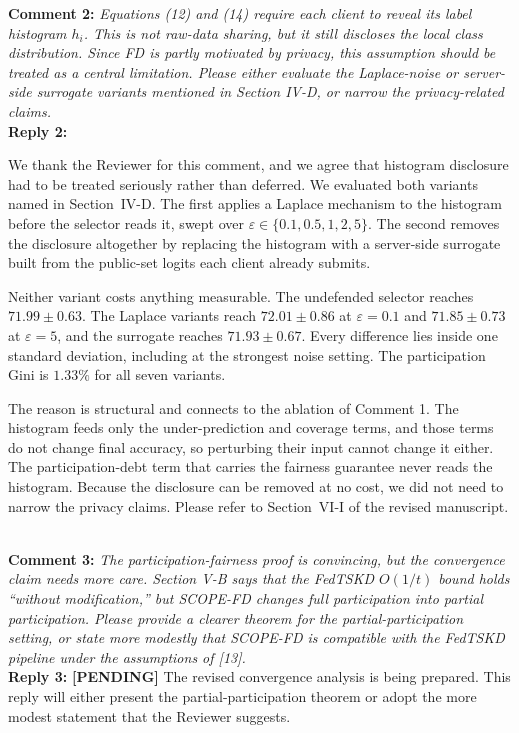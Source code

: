\documentclass[10pt]{article}
\newcommand{\PENDING}[1]{{\color{red}\textbf{[PENDING] }#1}}
\begin{document}
\noindent
\textbf{Comment 2:} \textit{Equations (12) and (14) require each client to reveal its label histogram $h_i$. This is not raw-data sharing, but it still discloses the local class distribution. Since FD is partly motivated by privacy, this assumption should be treated as a central limitation. Please either evaluate the Laplace-noise or server-side surrogate variants mentioned in Section IV-D, or narrow the privacy-related claims.} \\
\noindent
\textbf{Reply 2:} {We thank the Reviewer for this comment, and we agree that histogram disclosure had to be treated seriously rather than deferred. We evaluated both variants named in Section~IV-D. The first applies a Laplace mechanism to the histogram before the selector reads it, swept over $\varepsilon \in \{0.1, 0.5, 1, 2, 5\}$. The second removes the disclosure altogether by replacing the histogram with a server-side surrogate built from the public-set logits each client already submits.

Neither variant costs anything measurable. The undefended selector reaches $71.99 \pm 0.63$. The Laplace variants reach $72.01 \pm 0.86$ at $\varepsilon = 0.1$ and $71.85 \pm 0.73$ at $\varepsilon = 5$, and the surrogate reaches $71.93 \pm 0.67$. Every difference lies inside one standard deviation, including at the strongest noise setting. The participation Gini is $1.33\%$ for all seven variants.

The reason is structural and connects to the ablation of Comment 1. The histogram feeds only the under-prediction and coverage terms, and those terms do not change final accuracy, so perturbing their input cannot change it either. The participation-debt term that carries the fairness guarantee never reads the histogram. Because the disclosure can be removed at no cost, we did not need to narrow the privacy claims. Please refer to Section~VI-I of the revised manuscript.}\\

\noindent
\textbf{Comment 3:} \textit{The participation-fairness proof is convincing, but the convergence claim needs more care. Section V-B says that the FedTSKD $O(1/t)$ bound holds ``without modification,'' but SCOPE-FD changes full participation into partial participation. Please provide a clearer theorem for the partial-participation setting, or state more modestly that SCOPE-FD is compatible with the FedTSKD pipeline under the assumptions of [13].} \\
\noindent
\textbf{Reply 3:} \PENDING{The revised convergence analysis is being prepared. This reply will either present the partial-participation theorem or adopt the more modest statement that the Reviewer suggests.}\\
\end{document}
